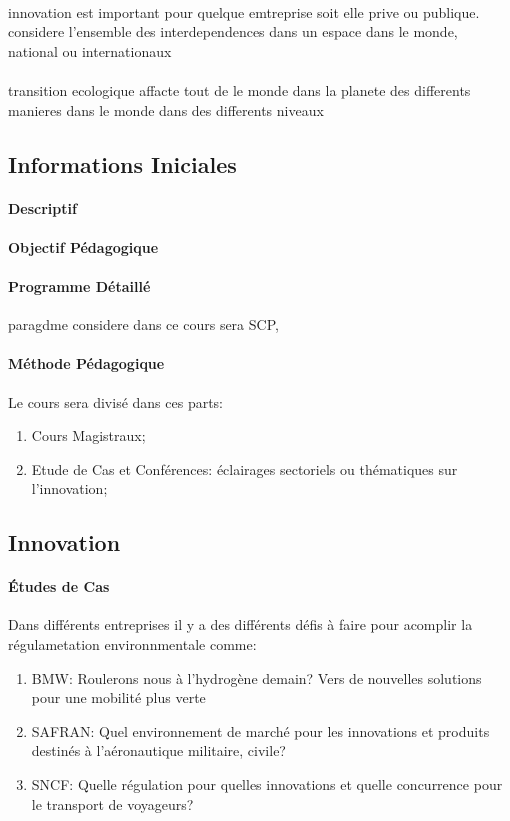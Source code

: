 \documentclass{article}
\begin{document}
\paragraph{}innovation est important pour quelque emtreprise soit elle prive ou publique. considere l'ensemble des interdependences dans un espace dans le monde, national ou internationaux 


\paragraph{}transition ecologique affacte tout de le monde dans la planete des differents manieres dans le monde dans des differents niveaux

\subsection{Informations Iniciales}
\paragraph{Descriptif}
\paragraph{Objectif Pédagogique}
\paragraph{Programme Détaillé}paragdme considere dans ce cours sera SCP, %
\paragraph{Méthode Pédagogique}Le cours sera divisé dans ces parts:
\begin{enumerate}
    \item Cours Magistraux;
    \item Etude de Cas et Conférences: éclairages sectoriels ou thématiques sur l'innovation;
\end{enumerate}

\subsection{Innovation}
\paragraph{Études de Cas}Dans différents entreprises il y a des différents défis à faire pour acomplir la régulametation environnmentale comme:
\begin{enumerate}
    \item BMW: Roulerons nous à l'hydrogène demain? Vers de nouvelles solutions pour une mobilité plus verte
    \item SAFRAN: Quel environnement de marché pour les innovations et produits destinés à l'aéronautique militaire, civile?
    \item SNCF: Quelle régulation pour quelles innovations et quelle concurrence pour le transport de voyageurs?
\end{enumerate}
\end{document}
